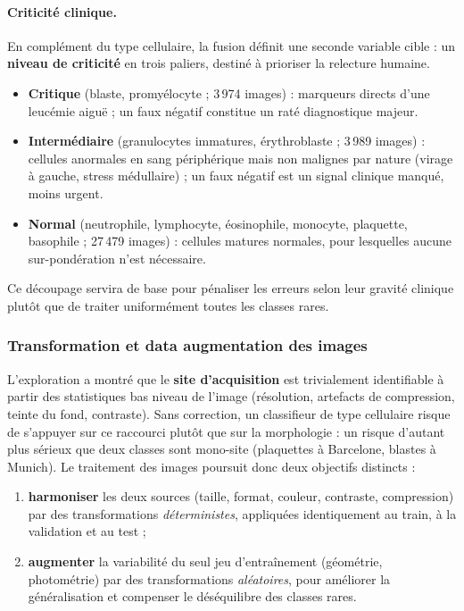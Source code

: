 \paragraph{Criticité clinique.} En complément du type cellulaire, la fusion définit une seconde variable cible : un \textbf{niveau de criticité} en trois paliers, destiné à prioriser la relecture humaine.
\begin{itemize}
  \item \textbf{Critique} (blaste, promyélocyte ; 3\,974 images) : marqueurs directs d’une leucémie aiguë ; un faux négatif constitue un raté diagnostique majeur.
  \item \textbf{Intermédiaire} (granulocytes immatures, érythroblaste ; 3\,989 images) : cellules anormales en sang périphérique mais non malignes par nature (virage à gauche, stress médullaire) ; un faux négatif est un signal clinique manqué, moins urgent.
  \item \textbf{Normal} (neutrophile, lymphocyte, éosinophile, monocyte, plaquette, basophile ; 27\,479 images) : cellules matures normales, pour lesquelles aucune sur-pondération n’est nécessaire.
\end{itemize}
Ce découpage servira de base pour pénaliser les erreurs selon leur gravité clinique plutôt que de traiter uniformément toutes les classes rares.

\subsubsection{Transformation et data augmentation des images}
\label{sub:transfo}

L’exploration a montré que le \textbf{site d’acquisition} est trivialement identifiable à partir des statistiques bas niveau de l’image (résolution, artefacts de compression, teinte du fond, contraste).
Sans correction, un classifieur de type cellulaire risque de s’appuyer sur ce raccourci plutôt que sur la morphologie : un risque d’autant plus sérieux que deux classes sont mono-site (plaquettes à Barcelone, blastes à Munich).
Le traitement des images poursuit donc deux objectifs distincts :

\begin{enumerate}
  \item \textbf{harmoniser} les deux sources (taille, format, couleur, contraste, compression) par des transformations \emph{déterministes}, appliquées identiquement au train, à la validation et au test ;
  \item \textbf{augmenter} la variabilité du seul jeu d’entraînement (géométrie, photométrie) par des transformations \emph{aléatoires}, pour améliorer la généralisation et compenser le déséquilibre des classes rares.
\end{enumerate}

